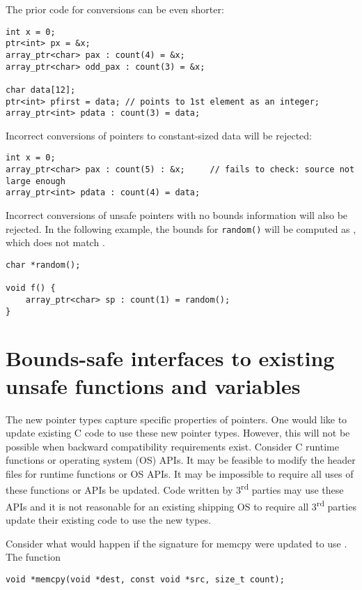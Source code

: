 The prior code for conversions can be even shorter:
\begin{verbatim}
int x = 0;
ptr<int> px = &x;
array_ptr<char> pax : count(4) = &x;
array_ptr<char> odd_pax : count(3) = &x;

char data[12];
ptr<int> pfirst = data; // points to 1st element as an integer;
array_ptr<int> pdata : count(3) = data;
\end{verbatim}
Incorrect conversions of pointers to constant-sized data will be rejected:
\begin{verbatim}
int x = 0;
array_ptr<char> pax : count(5) : &x;     // fails to check: source not large enough
array_ptr<int> pdata : count(4) = data;
\end{verbatim}

Incorrect conversions of unsafe pointers with no bounds information
will also be rejected.  In the following example, the bounds for 
\texttt{random()} will be computed as \boundsnone, which does
not match .
\begin{verbatim}
char *random();

void f() {
    array_ptr<char> sp : count(1) = random(); 
}
\end{verbatim}

\section{Bounds-safe interfaces to existing unsafe functions and variables}
\label{section:function-bounds-safe-interfaces}

The new pointer types capture specific properties of pointers. One would
like to update existing C code to use these new pointer types. However,
this will not be possible when backward compatibility requirements
exist. Consider C runtime functions or operating system (OS) APIs. 
It may be feasible to modify the header files for runtime functions or OS APIs. 
It may be
impossible to require all uses of these functions or APIs be updated.
Code written by 3\textsuperscript{rd} parties may use these APIs and it
is not reasonable for an existing shipping OS to require all
3\textsuperscript{rd} parties update their existing code to use the new
types.

Consider what would happen if the signature for memcpy were updated to
use \arrayptr. The function

\begin{verbatim}
void *memcpy(void *dest, const void *src, size_t count);
\end{verbatim}

